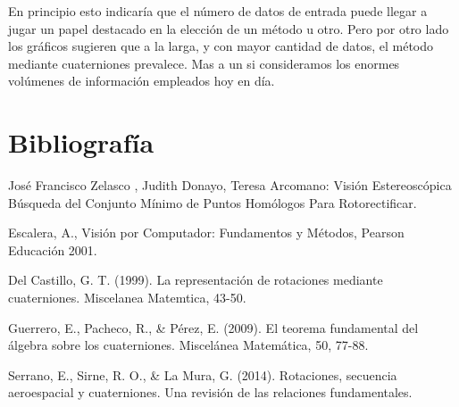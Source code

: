 \documentclass[spanish]{article}
\begin{document}
  En principio esto indicaría que el número de datos de entrada puede llegar a jugar un papel destacado en la elección de un método u otro. 
  Pero por otro lado los gráficos sugieren que a la larga, y con mayor cantidad de datos, el método mediante cuaterniones prevalece. Mas a un si consideramos los enormes volúmenes de información empleados hoy en día.
  


\clearpage
  \section{Bibliograf\'ia}

  \begin{thebibliography}{99} 
  
  José Francisco Zelasco , Judith Donayo, Teresa Arcomano: Visión Estereoscópica Búsqueda del Conjunto Mínimo de Puntos Homólogos Para Rotorectificar.
  
  Escalera, A., Visión por Computador: Fundamentos y Métodos, Pearson Educación 2001.
  
  Del Castillo, G. T. (1999). La representación de rotaciones mediante cuaterniones. Miscelanea Matemtica, 43-50.
  
  Guerrero, E., Pacheco, R., & Pérez, E. (2009). El teorema fundamental del álgebra sobre los cuaterniones. Miscelánea Matemática, 50, 77-88.
  
  Serrano, E., Sirne, R. O., & La Mura, G. (2014). Rotaciones, secuencia aeroespacial y cuaterniones. Una revisión de las relaciones fundamentales.

  \end{thebibliography}
\end{document}
